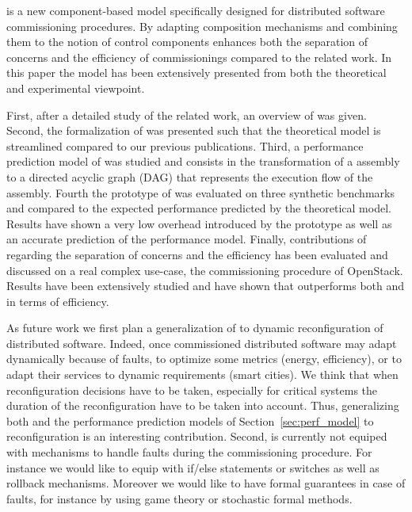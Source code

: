 \mad is a new component-based model specifically designed for
distributed software commissioning procedures. By adapting composition
mechanisms and combining them to the notion of control components \mad
enhances both the separation of concerns and the efficiency of
commissionings compared to the related work. In this paper the \mad
model has been extensively presented from both the theoretical and
experimental viewpoint.

First, after a detailed study of the related work, an overview of \mad
was given. Second, the formalization of \mad was presented such that
the theoretical model is streamlined compared to our previous
publications. Third, a performance prediction model of \mad was
studied and consists in the transformation of a \mad assembly to a
directed acyclic graph (DAG) that represents the execution flow of the
assembly. Fourth the prototype of \mad was evaluated on three
synthetic benchmarks and compared to the expected performance
predicted by the theoretical model. Results have shown a very low
overhead introduced by the prototype as well as an accurate prediction
of the performance model. Finally, contributions of \mad regarding the
separation of concerns and the efficiency has been evaluated and
discussed on a real complex use-case, the commissioning procedure of
OpenStack. Results have been extensively studied and have shown that
\mad outperforms both \ansible and \aeolus in terms of efficiency.

As future work we first plan a generalization of \mad to dynamic
reconfiguration of distributed software. Indeed, once commissioned
distributed software may adapt dynamically because of faults, to
optimize some metrics (\eg energy, efficiency), or to adapt their
services to dynamic requirements (\eg smart cities). We think that
when reconfiguration decisions have to be taken, especially for
critical systems the duration of the reconfiguration have to be taken
into account. Thus, generalizing both \mad and the performance
prediction models of Section~\ref{sec:perf_model} to reconfiguration
is an interesting contribution. Second, \mad is currently not equiped
with mechanisms to handle faults during the commissioning
procedure. For instance we would like to equip \mad with if/else
statements or switches as well as rollback mechanisms. Moreover we
would like to have formal guarantees in case of faults, for instance
by using game theory or stochastic formal methods.

  